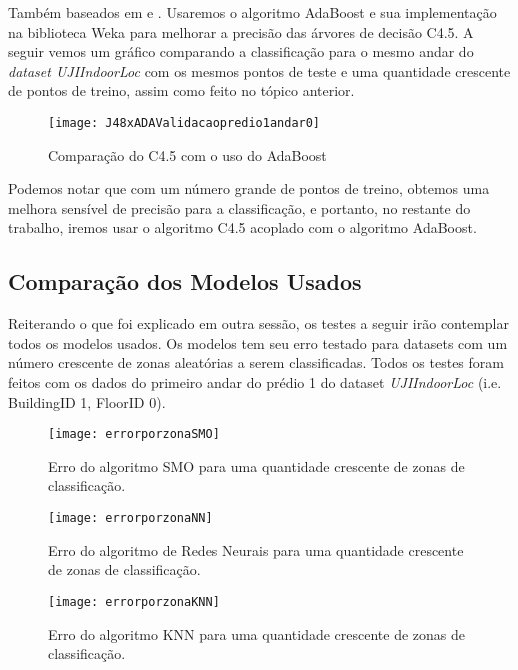 Também baseados em \cite{comparative} e \cite{comparativeEN}. Usaremos o algoritmo AdaBoost  e sua implementação na biblioteca Weka para melhorar a precisão das árvores de decisão C4.5. A seguir vemos um gráfico comparando a classificação para o mesmo andar do \textit{dataset UJIIndoorLoc} com os mesmos pontos de teste e uma quantidade crescente de pontos de treino, assim como feito no tópico anterior.


\begin{figure}[!h]
\centering
\caption{Comparação do C4.5 com o uso do AdaBoost}
 \texttt{[image: J48xADAValidacaopredio1andar0]}
\label{fig:euclidian}  
\end{figure}


Podemos notar que com um número grande de pontos de treino, obtemos uma melhora sensível de precisão para a classificação, e portanto, no restante do trabalho, iremos usar o algoritmo C4.5 acoplado com o algoritmo AdaBoost.



\subsection{Comparação dos Modelos Usados}


Reiterando o que foi explicado em outra sessão, os testes a seguir irão contemplar todos os modelos usados. Os modelos tem seu erro testado para datasets com um número crescente de zonas aleatórias a serem classificadas. Todos os testes foram feitos com os dados do primeiro andar do prédio 1 do dataset \textit{UJIIndoorLoc }(i.e. BuildingID 1, FloorID 0).


\begin{figure}[!h]
	\centering
	\caption{Erro do algoritmo SMO  para uma quantidade crescente de zonas de classificação.}
  \texttt{[image: errorporzonaSMO]}
\label{fig:zonaSMO}  

\end{figure}



\begin{figure}[!h]
	\centering
	\caption{Erro do algoritmo de Redes Neurais  para uma quantidade crescente de zonas de classificação.}
  \texttt{[image: errorporzonaNN]}
\label{fig:zonaNN}  

\end{figure}


\begin{figure}[!h]
	\centering
	\caption{Erro do algoritmo KNN para uma quantidade crescente de zonas de classificação.}
  \texttt{[image: errorporzonaKNN]}
\label{fig:zonaKNN}  

\end{figure}



